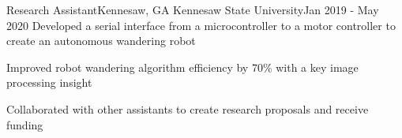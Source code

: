 \resumeSubheading
{Research Assistant}{Kennesaw, GA}
{Kennesaw State University}{Jan 2019 - May 2020}
\resumeItemListStart
\resumeItem
{
    Developed a serial interface from a microcontroller to a motor controller
    to create an autonomous wandering robot
}

\resumeItem
{
    Improved robot wandering algorithm efficiency by 70\% with a key image processing insight
}

\resumeItem
{
    Collaborated with other assistants to create research proposals and receive funding
}
\resumeItemListEnd
